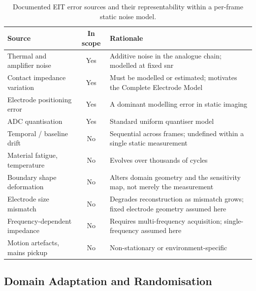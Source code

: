 \begin{table}[htbp]
\centering
\caption[Documented EIT error sources and their representability]{Documented EIT error sources and their representability within a per-frame static noise model.}
\label{tab:error-sources}
\small
\begin{tabularx}{\textwidth}{@{}lcX@{}}
\toprule
\textbf{Source} & \textbf{In scope} & \textbf{Rationale} \\
\midrule
Thermal and amplifier noise      & Yes & Additive noise in the analogue chain; modelled at fixed \gls{snr} \parencite{adler2006} \\
\midrule
Contact impedance variation      & Yes & Must be modelled or estimated; motivates the Complete Electrode Model \parencite{vilhunen2002, somersalo1992} \\
\midrule
Electrode positioning error      & Yes & A dominant modelling error in static imaging \parencite{kolehmainen1997} \\
\midrule
ADC quantisation                 & Yes & Standard uniform quantiser model \parencite{widrow1996quantization} \\
\midrule
Temporal / baseline drift        & No  & Sequential across frames; undefined within a single static measurement \parencite{boone1996} \\
\midrule
Material fatigue, temperature    & No  & Evolves over thousands of cycles \parencite{kim2024} \\
\midrule
Boundary shape deformation       & No  & Alters domain geometry and the sensitivity map, not merely the measurement \parencite{kolehmainen1997} \\
\midrule
Electrode size mismatch          & No  & Degrades reconstruction as mismatch grows; fixed electrode geometry assumed here \parencite{kolehmainen1997} \\
\midrule
Frequency-dependent impedance    & No  & Requires multi-frequency acquisition; single-frequency assumed here \\
\midrule
Motion artefacts, mains pickup   & No  & Non-stationary or environment-specific \\
\bottomrule
\end{tabularx}
\end{table}

\subsection{Domain Adaptation and Randomisation}
\label{sec:lit-sim2real-da}


